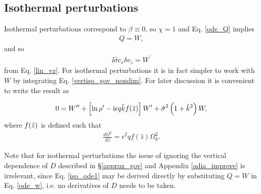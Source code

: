 \subsection{Isothermal perturbations}\label{iso_discuss}
Isothermal perturbations correspond to $\beta\equiv0$, 
so $\chi=1$ and Eq. \ref{ode_Q} implies 
\begin{align}
  Q = W, 
\end{align}
 and so 
 \begin{align}
   \ii\hat{\sigma}c_s\delta v_z = W^\prime
 \end{align}
from Eq. \ref{lin_vz}. For isothermal perturbations it is in fact 
simpler to work with $W$ by integrating Eq. \ref{vertiso_gov_nondim}. For later discussion
it is convenient to write the result as 

\begin{align}
  0 = W^{\prime\prime} + \left[\ln\rho^\prime - \mathrm{i} \epsilon q \hat{k}
    f(\hat{z})\right]W^\prime + \hat{\sigma}^2\left(1+\hat{k}^2\right)W,\label{iso_ode1}
\end{align}
where $f(\hat{z})$ is defined such that
\begin{align}\label{fz_shear}
  \frac{d\Omega^2}{d\hat{z}} = \epsilon^2q f(\hat{z})\Omega_k^2.
\end{align}


Note that for isothermal perturbations the issue of ignoring the
vertical dependence of $D$ described in \S\ref{approx_gov} and Appendix
\ref{adia_improve} is irrelevant, since
Eq. \ref{iso_ode1} may be derived directly by substituting $Q=W$ in
Eq. \ref{ode_w}, i.e. no derivatives of $D$ needs to be taken. 

